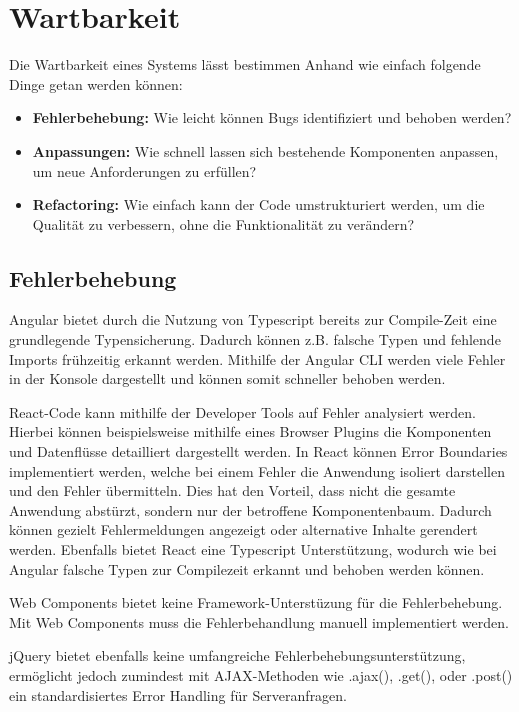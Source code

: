 \documentclass[oneside]{ausarbeitung}
\begin{document}
\section{Wartbarkeit}
Die Wartbarkeit eines Systems lässt bestimmen Anhand wie einfach folgende Dinge getan werden können: 
\begin{itemize}
    \item \textbf{Fehlerbehebung:} Wie leicht können Bugs identifiziert und behoben werden?
    \item \textbf{Anpassungen:} Wie schnell lassen sich bestehende Komponenten anpassen, um neue Anforderungen zu erfüllen?
    \item \textbf{Refactoring:} Wie einfach kann der Code umstrukturiert werden, um die Qualität zu verbessern, ohne die Funktionalität zu verändern?
\end{itemize}

\subsection{Fehlerbehebung}

Angular bietet durch die Nutzung von Typescript bereits zur Compile-Zeit eine grundlegende Typensicherung. Dadurch können z.B. falsche Typen und fehlende Imports frühzeitig erkannt werden. Mithilfe der Angular CLI werden viele Fehler in der Konsole dargestellt und können somit schneller behoben werden. 

React-Code kann mithilfe der Developer Tools auf Fehler analysiert werden. Hierbei können beispielsweise mithilfe eines Browser Plugins die Komponenten und Datenflüsse detailliert dargestellt werden. In React können Error Boundaries implementiert werden, welche bei einem Fehler die Anwendung isoliert darstellen und den Fehler übermitteln. Dies hat den Vorteil, dass nicht die gesamte Anwendung abstürzt, sondern nur der betroffene Komponentenbaum. Dadurch können gezielt Fehlermeldungen angezeigt oder alternative Inhalte gerendert werden. Ebenfalls bietet React eine Typescript Unterstützung, wodurch wie bei Angular falsche Typen zur Compilezeit erkannt und behoben werden können. 

Web Components bietet keine Framework-Unterstüzung für die Fehlerbehebung. Mit Web Components muss die Fehlerbehandlung manuell implementiert werden. 

jQuery bietet ebenfalls keine umfangreiche Fehlerbehebungsunterstützung, ermöglicht jedoch zumindest mit AJAX-Methoden wie .ajax(), .get(), oder .post() ein standardisiertes Error Handling für Serveranfragen.
\end{document}
